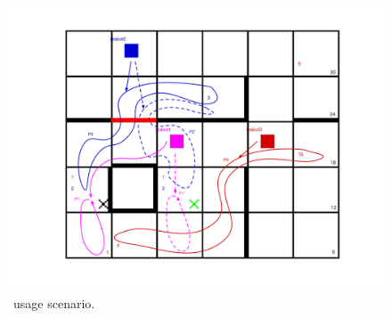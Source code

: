 \begin{figure}[t]
\begin{center}
\includegraphics[width=1\linewidth]{Figures/arrows.pdf}
\caption{\toolName\ usage scenario.}
\label{fig:outputexample}
\end{center}
\end{figure}






